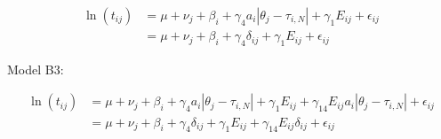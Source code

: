 \documentclass[
]{agujournal2019}
\begin{document}
\begin{align}
\ln{(t_{ij})} &= \mu + \nu_j + \beta_i + \gamma_4 a_i |\theta_j - \tau_{i,N}|+ \gamma_1E_{ij}+\epsilon_{ij} \\
&=\mu + \nu_j +\beta_i +\gamma_4\delta_{ij}+\gamma_1 E_{ij}+\epsilon_{ij}
\end{align}

Model B3:

\begin{align}
\ln{(t_{ij})} &= \mu + \nu_j + \beta_i + \gamma_4 a_i |\theta_j - \tau_{i,N}|+ \gamma_1E_{ij}+\gamma_{14}E_{ij}a_i|\theta_j-\tau_{i,N}|+\epsilon_{ij} \\
&=\mu + \nu_j +\beta_i +\gamma_4\delta_{ij}+\gamma_1 E_{ij}+\gamma_{14}E_{ij}\delta_{ij}+\epsilon_{ij}
\end{align}
\end{document}
